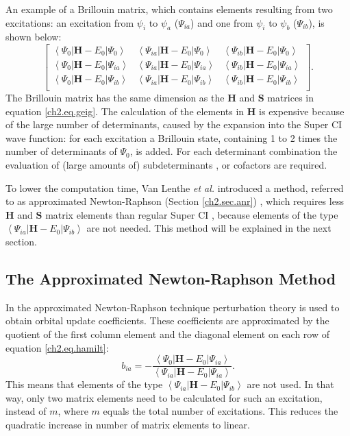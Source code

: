 An example of a Brillouin matrix, which contains elements resulting from two excitations: an excitation from $\psi_i$ to $\psi_a$ ($\Psi_{ia}$) and one from $\psi_i$ to $\psi_b$ ($\Psi_{ib}$), is shown below:
\begin{equation}
\left[\begin{array}{ccc}
\left< \Psi_{0} | \mathbf{H}-E_0 | \Psi_{0} \right> & \left< \Psi_{ia} | \mathbf{H}-E_0 | \Psi_{0} \right> & \left< \Psi_{ib} | \mathbf{H}-E_0 | \Psi_{0} \right> \\
\left< \Psi_{0} | \mathbf{H}-E_0 | \Psi_{ia} \right> & \left< \Psi_{ia} | \mathbf{H}-E_0 | \Psi_{ia} \right> & \left< \Psi_{ib} | \mathbf{H}-E_0 | \Psi_{ia} \right> \\
\left< \Psi_{0} | \mathbf{H}-E_0 | \Psi_{ib} \right> & \left< \Psi_{ia} | \mathbf{H}-E_0 | \Psi_{ib} \right> & \left< \Psi_{ib} | \mathbf{H}-E_0 | \Psi_{ib} \right> \\
\end{array}\right].
\label{ch2.eq.hamilt}
\end{equation}
The Brillouin matrix has the same dimension as the $\mathbf{H}$ and $\mathbf{S}$ matrices in equation \ref{ch2.eq.geig}. The calculation of the elements in $\mathbf{H}$ is expensive because of the large number of determinants, caused by the expansion into the Super CI wave function: for each excitation a Brillouin state, containing 1 to 2 times the number of determinants of $\Psi_0$, is added. For each determinant combination the evaluation of (large amounts of) subdeterminants \cite{koos2}, or cofactors are required.

To lower the computation time, Van Lenthe \textit{et al.} introduced a method, referred to as approximated Newton-Raphson (Section \ref{ch2.sec.anr}) \cite{koos1}, which requires less $\mathbf{H}$ and $\mathbf{S}$ matrix elements than regular Super CI \cite{koos1}, because elements of the type $\left < \Psi_{ia} | \mathbf{H} - E_0 | \Psi_{ib} \right >$ are not needed. This method will be explained in the next section.

\subsection{\label{ch2.sec.anr}The Approximated Newton-Raphson Method}

In the approximated Newton-Raphson technique perturbation theory is used to obtain orbital update coefficients. These coefficients are approximated by the quotient of the first column element and the diagonal element on each row of equation \ref{ch2.eq.hamilt}:
\begin{equation}
b_{ia}= - \frac{\left< \Psi_{0} | \mathbf{H}-E_0 | \Psi_{ia} \right>}{\left< \Psi_{ia} | \mathbf{H}-E_0 | \Psi_{ia} \right>}.
\label{ch2.eq.anr}
\end{equation}
This means that elements of the type $\left< \Psi_{ia} | \mathbf{H}-E_0 | \Psi_{ib} \right>$ are not used. In that way, only two matrix elements need to be calculated for such an excitation, instead of $m$, where $m$ equals the total number of excitations. This reduces the quadratic increase in number of matrix elements to linear.

